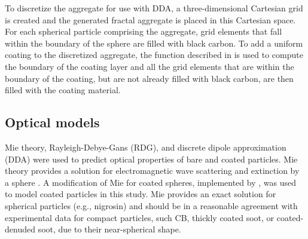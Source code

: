 \documentclass[12pt,authoryear]{elsarticle}
\begin{document}
To discretize the aggregate for use with DDA, a three-dimensional Cartesian grid is created and the generated fractal aggregate is placed in this Cartesian space. For each spherical particle comprising the aggregate, grid elements that fall within the boundary of the sphere are filled with black carbon. To add a uniform coating to the discretized aggregate, the function described in \citet{RN22} is used to compute the boundary of the coating layer and all the grid elements that are within the boundary of the coating, but are not already filled with black carbon, are then filled with the coating material.


\subsection{Optical models}

Mie theory, Rayleigh-Debye-Gans (RDG),  and discrete dipole approximation (DDA) were used to predict optical properties of bare and coated particles. Mie theory provides a solution for electromagnetic wave scattering and extinction by a sphere \citep{RN1}. A modification of Mie for coated spheres, implemented by \cite{RN19}, was used to model coated particles in this study. Mie provides an exact solution for spherical particles (e.g., nigrosin) and should be in a reasonable agreement with experimental data for compact particles, such CB, thickly coated soot, or coated-denuded soot, due to their near-spherical shape.
\end{document}
